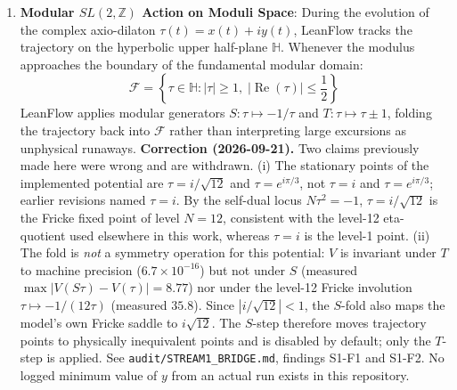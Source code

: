 \documentclass[11pt,a4paper]{article}
\begin{document}
\begin{enumerate}
    \item \textbf{Modular $SL(2, \mathbb{Z})$ Action on Moduli Space}: During the evolution of the complex axio-dilaton $\tau(t) = x(t) + i y(t)$, LeanFlow tracks the trajectory on the hyperbolic upper half-plane $\mathbb{H}$. Whenever the modulus approaches the boundary of the fundamental modular domain:
    \begin{equation}
    \mathcal{F} = \left\{ \tau \in \mathbb{H} : |\tau| \ge 1, \; |\operatorname{Re}(\tau)| \le \frac{1}{2} \right\}
    \end{equation}
    LeanFlow applies modular generators $S: \tau \mapsto -1/\tau$ and $T: \tau \mapsto \tau \pm 1$, folding the trajectory back into $\mathcal{F}$ rather than interpreting large excursions as unphysical runaways. \textbf{Correction (2026-09-21).} Two claims previously made here were wrong and are withdrawn. (i) The stationary points of the implemented potential are $\tau = i/\sqrt{12}$ and $\tau = e^{i\pi/3}$, not $\tau = i$ and $\tau = e^{i\pi/3}$; earlier revisions named $\tau = i$. By the self-dual locus $N\tau^2 = -1$, $\tau = i/\sqrt{12}$ is the Fricke fixed point of level $N = 12$, consistent with the level-12 eta-quotient used elsewhere in this work, whereas $\tau = i$ is the level-1 point. (ii) The fold is \emph{not} a symmetry operation for this potential: $V$ is invariant under $T$ to machine precision ($6.7\times 10^{-16}$) but not under $S$ (measured $\max|V(S\tau) - V(\tau)| = 8.77$) nor under the level-12 Fricke involution $\tau\mapsto -1/(12\tau)$ (measured $35.8$). Since $|i/\sqrt{12}| < 1$, the $S$-fold also maps the model's own Fricke saddle to $i\sqrt{12}$. The $S$-step therefore moves trajectory points to physically inequivalent points and is disabled by default; only the $T$-step is applied. See \texttt{audit/STREAM1\_BRIDGE.md}, findings S1-F1 and S1-F2. No logged minimum value of $y$ from an actual run exists in this repository.
\end{enumerate}
\end{document}
